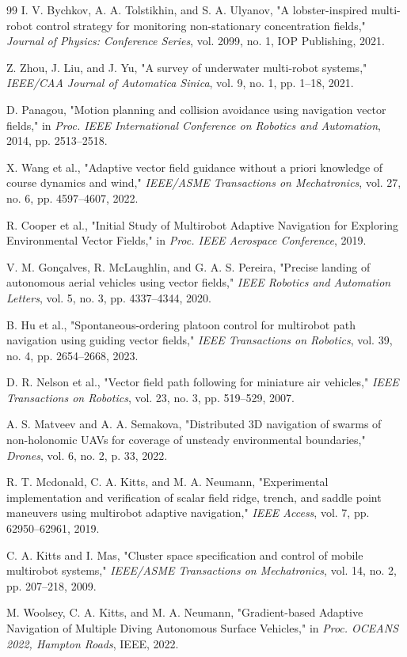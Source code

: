 \documentclass[lettersize,journal]{IEEEtran}
\begin{document}
\begin{thebibliography}{99}
 I. V. Bychkov, A. A. Tolstikhin, and S. A. Ulyanov, "A lobster-inspired multi-robot control strategy for monitoring non-stationary concentration fields," \textit{Journal of Physics: Conference Series}, vol. 2099, no. 1, IOP Publishing, 2021.

 Z. Zhou, J. Liu, and J. Yu, "A survey of underwater multi-robot systems," \textit{IEEE/CAA Journal of Automatica Sinica}, vol. 9, no. 1, pp. 1--18, 2021.

 D. Panagou, "Motion planning and collision avoidance using navigation vector fields," in \textit{Proc. IEEE International Conference on Robotics and Automation}, 2014, pp. 2513--2518.

 X. Wang et al., "Adaptive vector field guidance without a priori knowledge of course dynamics and wind," \textit{IEEE/ASME Transactions on Mechatronics}, vol. 27, no. 6, pp. 4597--4607, 2022.

\vfill\eject  %

 R. Cooper et al., "Initial Study of Multirobot Adaptive Navigation for Exploring Environmental Vector Fields," in \textit{Proc. IEEE Aerospace Conference}, 2019.

 V. M. Gonçalves, R. McLaughlin, and G. A. S. Pereira, "Precise landing of autonomous aerial vehicles using vector fields," \textit{IEEE Robotics and Automation Letters}, vol. 5, no. 3, pp. 4337--4344, 2020.

 B. Hu et al., "Spontaneous-ordering platoon control for multirobot path navigation using guiding vector fields," \textit{IEEE Transactions on Robotics}, vol. 39, no. 4, pp. 2654--2668, 2023.

 D. R. Nelson et al., "Vector field path following for miniature air vehicles," \textit{IEEE Transactions on Robotics}, vol. 23, no. 3, pp. 519--529, 2007.

 A. S. Matveev and A. A. Semakova, "Distributed 3D navigation of swarms of non-holonomic UAVs for coverage of unsteady environmental boundaries," \textit{Drones}, vol. 6, no. 2, p. 33, 2022.

 R. T. Mcdonald, C. A. Kitts, and M. A. Neumann, "Experimental implementation and verification of scalar field ridge, trench, and saddle point maneuvers using multirobot adaptive navigation," \textit{IEEE Access}, vol. 7, pp. 62950--62961, 2019.

 C. A. Kitts and I. Mas, "Cluster space specification and control of mobile multirobot systems," \textit{IEEE/ASME Transactions on Mechatronics}, vol. 14, no. 2, pp. 207--218, 2009.

 M. Woolsey, C. A. Kitts, and M. A. Neumann, "Gradient-based Adaptive Navigation of Multiple Diving Autonomous Surface Vehicles," in \textit{Proc. OCEANS 2022, Hampton Roads}, IEEE, 2022.

\end{thebibliography}
\end{document}
